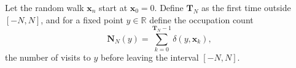 Let the random walk $\mathbf{x}_n$ start at $\mathbf{x}_0 = 0$. Define $\mathbf{T}_N$ as the first time outside $[-N,N]$, and for a fixed point $y \in \mathbb{R}$ define the occupation count
$$\mathbf{N}_N(y) = \sum_{k=0}^{\mathbf{T}_N - 1} \delta(y, \mathbf{x}_k),$$
the number of visits to $y$ before leaving the interval $[-N,N]$.
